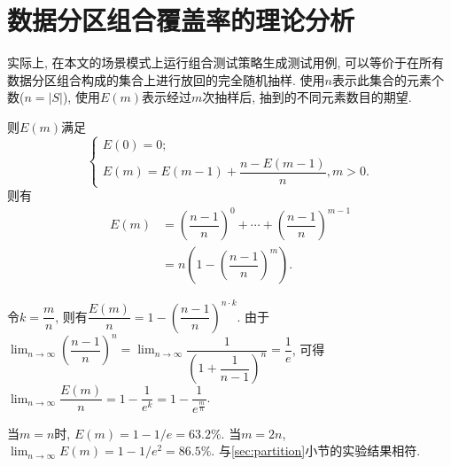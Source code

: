 \chapter{数据分区组合覆盖率的理论分析}
    \label{sec:partition_deduction}
    
    实际上, 在本文的场景模式上运行组合测试策略生成测试用例, 可以等价于在所有数据分区组合构成的集合上进行放回的完全随机抽样. 使用$n$表示此集合的元素个数($n = |S|$), 使用$E(m)$表示经过$m$次抽样后, 抽到的不同元素数目的期望.
    
    则$E(m)$满足
    \begin{equation*}
        \left\{
        \begin{array}{l}
             E(0) = 0; \\
             E(m) = E(m-1) + \dfrac{n - E(m-1)}{n}, m > 0.
        \end{array}
        \right.
    \end{equation*}
    则有
    \begin{equation*}
        \begin{aligned}
        	E(m) & =\left(\dfrac{n-1}{n}\right)^{0} + \cdots + \left(\dfrac{n-1}{n}\right)^{m-1} \\
            & = n\left(1-(\dfrac{n-1}{n})^{m}\right).
    	\end{aligned}
    \end{equation*}
    
    令$k = \dfrac{m}{n}$, 则有$\dfrac{E(m)}{n} = 1 - \left(\dfrac{n-1}{n}\right)^{n\cdot k}$. 由于$\lim_{n\to\infty} \left(\dfrac{n-1}{n}\right)^n = \lim_{n\to\infty} \dfrac{1}{\left(1+\dfrac{1}{n-1}\right)^n} = \dfrac{1}{e}$, 可得$\lim_{n\to\infty}\dfrac{E(m)}{n} = 1 - \dfrac{1}{e^{k}} = 1 - \dfrac{1}{e^\frac{m}{n}}$.
    
    当$m=n$时, $E(m) = 1 - 1 / e = 63.2\%$. 当$m=2n$, $\lim_{n\to\infty} E(m) = 1 - 1 / e^2 = 86.5\%$. 与\ref{sec:partition}小节的实验结果相符.